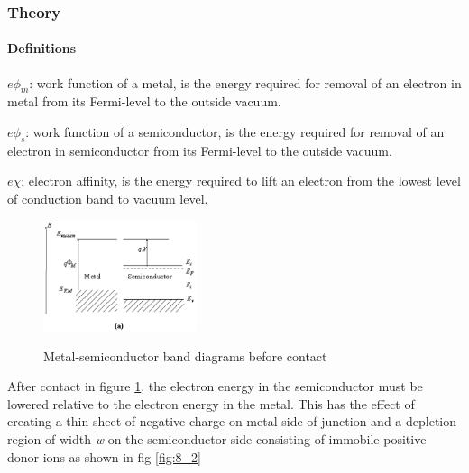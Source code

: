 \begin{frame}
  \frametitle{Theory}
  \framesubtitle{Definitions}
  $ e\phi_m$: work function of a metal, is the energy required for removal of an electron in metal from its Fermi-level to the outside vacuum.

  $e\phi_s$: work function of a semiconductor, is the energy required for removal of an electron in semiconductor from its Fermi-level to the outside vacuum.

  $e\chi$: electron affinity, is the energy required to lift an electron from the lowest level of conduction band to vacuum level.
\end{frame}

\begin{frame}
  \begin{figure}[h]
    \caption{Metal-semiconductor band diagrams before contact}
    \centering
    \includegraphics[width=0.4\textwidth]{./images/chapter8/fig8_1.png}
    \label{fig:8_1}
  \end{figure}

  After contact in figure \ref{fig:8_1}, the electron energy in the semiconductor must be lowered relative to the electron energy in the metal. This has the effect of creating a thin sheet of negative charge on metal side of junction and a depletion region of width \textit{w} on the semiconductor side consisting of immobile positive donor ions as shown in fig \ref{fig:8_2}
\end{frame}

